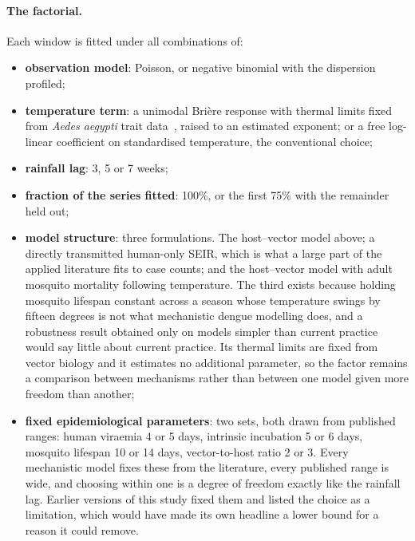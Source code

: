 \documentclass[11pt,a4paper]{article}
\begin{document}
\paragraph{The factorial.} Each window is fitted under all combinations of:

\begin{itemize}
\item \textbf{observation model}: Poisson, or negative binomial with the
      dispersion profiled;
\item \textbf{temperature term}: a unimodal Brière response with thermal limits
      fixed from \emph{Aedes aegypti} trait data~\cite{mordecai,mordecai2019},
      raised to an estimated exponent; or a free log-linear coefficient on standardised temperature,
      the conventional choice;
\item \textbf{rainfall lag}: 3, 5 or 7 weeks;
\item \textbf{fraction of the series fitted}: 100\%, or the first 75\% with the
      remainder held out;
\item \textbf{model structure}: three formulations. The host--vector model
      above; a directly transmitted human-only SEIR, which is what a large part
      of the applied literature fits to case counts; and the host--vector model
      with adult mosquito mortality following temperature. The third exists
      because holding mosquito lifespan constant across a season whose
      temperature swings by fifteen degrees is not what mechanistic dengue
      modelling does, and a robustness result obtained only on models simpler
      than current practice would say little about current practice. Its thermal
      limits are fixed from vector biology and it estimates no additional
      parameter, so the factor remains a comparison between mechanisms rather
      than between one model given more freedom than another;
\item \textbf{fixed epidemiological parameters}: two sets, both drawn from
      published ranges: human viraemia 4 or 5 days, intrinsic incubation 5 or 6
      days, mosquito lifespan 10 or 14 days, vector-to-host ratio 2 or 3. Every
      mechanistic model fixes these from the literature, every published range is
      wide, and choosing within one is a degree of freedom exactly like the
      rainfall lag. Earlier versions of this study fixed them and listed the
      choice as a limitation, which would have made its own headline a lower
      bound for a reason it could remove.
\end{itemize}
\end{document}
